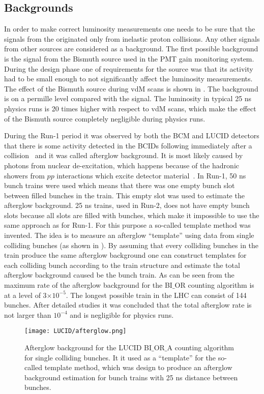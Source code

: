 \subsection{Backgrounds}
\label{subsec:backgrounds}
In order to make correct luminosity measurements one needs to be sure that the signals from the originated only from inelastic proton collisions.
Any other signals from other sources are considered as a background.
The first possible background is the signal from the Bismuth source used in the PMT gain monitoring system.
During the design phase one of requirements for the source was that its activity had to be small enough to not significantly affect the luminosity measurements.
The effect of the Bismuth source during vdM scans is shown in . The background is on a permille level compared with the signal.
The luminosity in typical 25 ns physics runs is 20 times higher with respect to vdM scans, which make the effect of the Bismuth source completely negligible during physics runs. 

During the Run-1 period it was observed by both the BCM and LUCID detectors that there is some activity detected in the BCIDs following immediately after a collision~\cite{Aad:2011dr,Aad:2013ucp}
and it was called afterglow background. It is most likely caused by photons from nuclear de-excitation, which happens because of the hadronic showers from $pp$ interactions which excite detector material~\cite{Aaboud:2016hhf}.
In Run-1, 50 ns bunch trains were used which means that there was one empty bunch slot between filled bunches in the train.
This empty slot was used to estimate the afterglow background.
25 ns trains, used in Run-2, does not have empty bunch slots because all slots are filled with bunches, which make it impossible to use the same approach as for Run-1.
For this purpose a so-called template method was invented. The idea is to measure an afterglow ``template'' using data from single colliding bunches (as shown in ).
By assuming that every colliding bunches in the train produce the same afterglow background one can construct templates for each colliding bunch according to the train structure and estimate the total afterglow background caused be the bunch train. 
As can be seen from  the maximum rate of the afterglow background for the BI$\_$OR counting algorithm is at a level of 3$\times10^{-5}$. 
The longest possible train in the LHC can consist of 144 bunches. 
After detailed studies it was concluded that the total afterglow rate is not larger than $10^{-4}$ and is negligible for physics runs.
\begin{figure}
\centering
\texttt{[image: LUCID/afterglow.png]}
\caption{Afterglow background for the LUCID BI$\_$OR$\_$A counting algorithm for single colliding bunches. 
It it used as a ``template'' for the so-called template method, which was design
to produce an afterglow background estimation for bunch trains with 25 ns distance between bunches.}
\label{fig:afterglow}
\end{figure}


